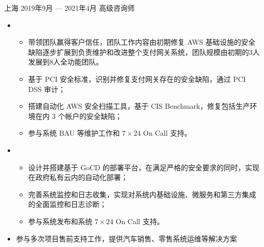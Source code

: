 \documentclass{resume}
\begin{document}
\smallskip
\begin{body}
	{上海}
	{2019年9月 --- 2021年4月}
	{高级咨询师}
	\begin{itemize}[noitemsep,topsep=0pt]
		\item {}
		\begin{itemize}[noitemsep,topsep=0pt]
			\item 带领团队赢得客户信任，团队工作内容由初期修复 AWS 基础设施的安全缺陷逐步扩展到负责维护和改进整个支付网关系统，团队规模由初期的3人发展到8人全功能团队。
			\item 基于 PCI 安全标准，识别并修复支付网关存在的安全缺陷，通过 PCI DSS 审计；
			\item 搭建自动化 AWS 安全扫描工具，基于 CIS Benchmark，修复包括生产环境在内 3 个帐户的安全缺陷；
			\item 参与系统 BAU 等维护工作和 $7\times 24$ On Call 支持。
		\end{itemize}
		\item {}
		\begin{itemize}[noitemsep,topsep=0pt]
			\item 设计并搭建基于 GoCD 的部署平台，在满足严格的安全要求的同时，实现在政府私有云内的自动化部署；
			\item 完善系统监控和日志收集，实现对系统内基础设施、微服务和第三方集成的全面监控和日志诊断；
			\item 参与系统发布和系统 $7\times 24$ On Call 支持。
		\end{itemize}
		\item 参与多次项目售前支持工作，提供汽车销售、零售系统运维等解决方案
	\end{itemize}


\end{body}
\end{document}
